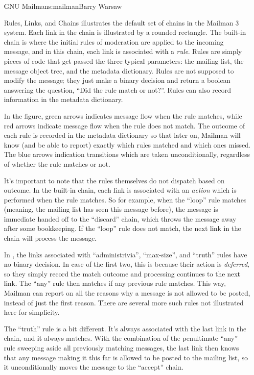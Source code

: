 \begin{aosachapter}{GNU Mailman}{s:mailman}{Barry Warsaw}
\begin{aosasect1}{Rules, Links, and Chains}
 illustrates the default set of chains
in the Mailman 3 system.  Each link in the chain is illustrated by a
rounded rectangle.  The built-in chain is where the initial rules of
moderation are applied to the incoming message, and in this chain,
each link is associated with a \emph{rule}.  Rules are simply pieces
of code that get passed the three typical parameters: the mailing
list, the message object tree, and the metadata dictionary.  Rules are
not supposed to modify the message; they just make a binary decision
and return a boolean answering the question, ``Did the rule match or
not?''.  Rules can also record information in the metadata dictionary.

In the figure, green arrows indicates message flow when the rule
matches, while red arrows indicate message flow when the rule does not
match.  The outcome of each rule is recorded in the metadata
dictionary so that later on, Mailman will know (and be able to report)
exactly which rules matched and which ones missed.  The blue arrows
indication transitions which are taken unconditionally, regardless of
whether the rule matches or not.


It's important to note that the rules themselves do not dispatch based
on outcome.  In the built-in chain, each link is associated with an
\emph{action} which is performed when the rule matches.  So for
example, when the ``loop'' rule matches (meaning, the mailing list has
seen this message before), the message is immediate handed off to the
``discard'' chain, which throws the message away after some
bookkeeping.  If the ``loop'' rule does not match, the next link in
the chain will process the message.

In , the links associated with
``administrivia'', ``max-size'', and ``truth'' rules have no binary
decision.  In case of the first two, this is because their action is
\emph{deferred}, so they simply record the match outcome and
processing continues to the next link.  The ``any'' rule then matches
if any previous rule matches.  This way, Mailman can report on all the
reasons why a message is not allowed to be posted, instead of just the
first reason.  There are several more such rules not illustrated here
for simplicity.

The ``truth'' rule is a bit different.  It's always associated with
the last link in the chain, and it always matches.  With the
combination of the penultimate ``any'' rule sweeping aside all
previously matching messages, the last link then knows that any
message making it this far is allowed to be posted to the
mailing list, so it unconditionally moves the message to the
``accept'' chain.


\end{aosasect1}
\end{aosachapter}
